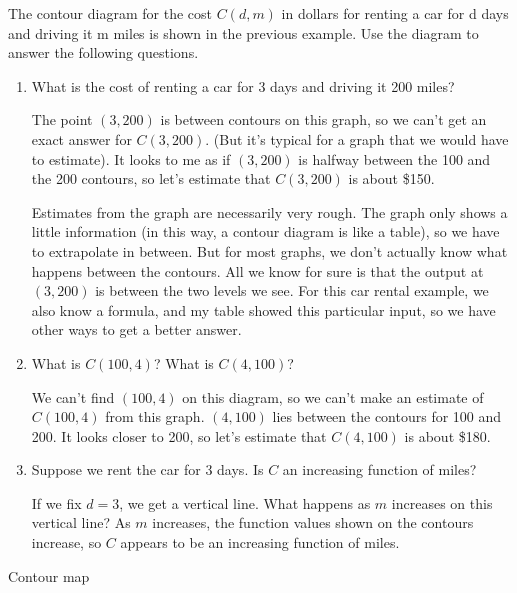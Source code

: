 \begin{example}
The contour diagram for the cost $C(d,m)$ in dollars for renting a car for d days and driving it m miles is shown in the previous example. Use the diagram to answer the following questions.
\begin{enumerate}[label=(\alph*)]
    \item What is the cost of renting a car for 3 days and driving it 200 miles?

    \begin{solution} The point $(3, 200)$ is between contours on this graph, so we can’t get an exact answer for $C(3,200)$. (But it’s typical for a graph that we would have to estimate). It looks to me as if $(3, 200)$ is halfway between the 100 and the 200 contours, so let's estimate that $C(3,200)$ is about \$150.

Estimates from the graph are necessarily very rough. The graph only shows a little information (in this way, a contour diagram is like a table), so we have to extrapolate in between. But for most graphs, we don’t actually know what happens between the contours. All we know for sure is that the output at $(3, 200)$ is between the two levels we see. For this car rental example, we also know a formula, and my table showed this particular input, so we have other ways to get a better answer.
    \end{solution}
    \item What is $C(100,4)$? What is $C(4,100)$?

    \begin{solution} We can't find $(100, 4)$ on this diagram, so we can't make an estimate of $C(100,4)$ from this graph. $(4, 100)$ lies between the contours for 100 and 200. It looks closer to 200, so let's estimate that $C(4,100)$ is about \$180.
    \end{solution}
    \item Suppose we rent the car for 3 days. Is $C$ an increasing function of miles?

    \begin{solution} If we fix $d=3$, we get a vertical line. What happens as $m$ increases on this vertical line? As $m$ increases, the function values shown on the contours increase, so $C$ appears to be an increasing function of miles.
    \end{solution}
\end{enumerate}
Contour map
\end{example}

